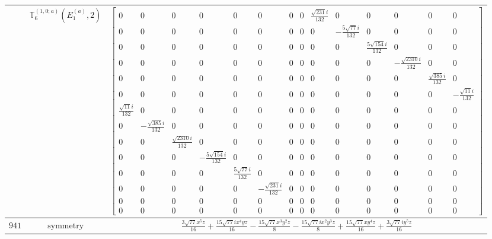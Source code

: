 \documentclass[fleqn,8pt,landscape]{jsarticle}
\begin{document}
\begin{longtable}{ccc}
$  $ & $ \mathbb{T}_{6}^{(1,0;a)}(E_{1}^{(a)},2) $ & $ \begin{bmatrix} 0 & 0 & 0 & 0 & 0 & 0 & 0 & 0 & \frac{\sqrt{231} i}{132} & 0 & 0 & 0 & 0 & 0 \\ 0 & 0 & 0 & 0 & 0 & 0 & 0 & 0 & 0 & - \frac{5 \sqrt{77} i}{132} & 0 & 0 & 0 & 0 \\ 0 & 0 & 0 & 0 & 0 & 0 & 0 & 0 & 0 & 0 & \frac{5 \sqrt{154} i}{132} & 0 & 0 & 0 \\ 0 & 0 & 0 & 0 & 0 & 0 & 0 & 0 & 0 & 0 & 0 & - \frac{\sqrt{2310} i}{132} & 0 & 0 \\ 0 & 0 & 0 & 0 & 0 & 0 & 0 & 0 & 0 & 0 & 0 & 0 & \frac{\sqrt{385} i}{132} & 0 \\ 0 & 0 & 0 & 0 & 0 & 0 & 0 & 0 & 0 & 0 & 0 & 0 & 0 & - \frac{\sqrt{11} i}{132} \\ \frac{\sqrt{11} i}{132} & 0 & 0 & 0 & 0 & 0 & 0 & 0 & 0 & 0 & 0 & 0 & 0 & 0 \\ 0 & - \frac{\sqrt{385} i}{132} & 0 & 0 & 0 & 0 & 0 & 0 & 0 & 0 & 0 & 0 & 0 & 0 \\ 0 & 0 & \frac{\sqrt{2310} i}{132} & 0 & 0 & 0 & 0 & 0 & 0 & 0 & 0 & 0 & 0 & 0 \\ 0 & 0 & 0 & - \frac{5 \sqrt{154} i}{132} & 0 & 0 & 0 & 0 & 0 & 0 & 0 & 0 & 0 & 0 \\ 0 & 0 & 0 & 0 & \frac{5 \sqrt{77} i}{132} & 0 & 0 & 0 & 0 & 0 & 0 & 0 & 0 & 0 \\ 0 & 0 & 0 & 0 & 0 & - \frac{\sqrt{231} i}{132} & 0 & 0 & 0 & 0 & 0 & 0 & 0 & 0 \\ 0 & 0 & 0 & 0 & 0 & 0 & 0 & 0 & 0 & 0 & 0 & 0 & 0 & 0 \\ 0 & 0 & 0 & 0 & 0 & 0 & 0 & 0 & 0 & 0 & 0 & 0 & 0 & 0 \end{bmatrix} $ \\ \hline
$ 941 $ & $ \text{symmetry} $ & $ \frac{3 \sqrt{77} x^{5} z}{16} + \frac{15 \sqrt{77} i x^{4} y z}{16} - \frac{15 \sqrt{77} x^{3} y^{2} z}{8} - \frac{15 \sqrt{77} i x^{2} y^{3} z}{8} + \frac{15 \sqrt{77} x y^{4} z}{16} + \frac{3 \sqrt{77} i y^{5} z}{16} $ \\

\end{longtable}
\end{document}

